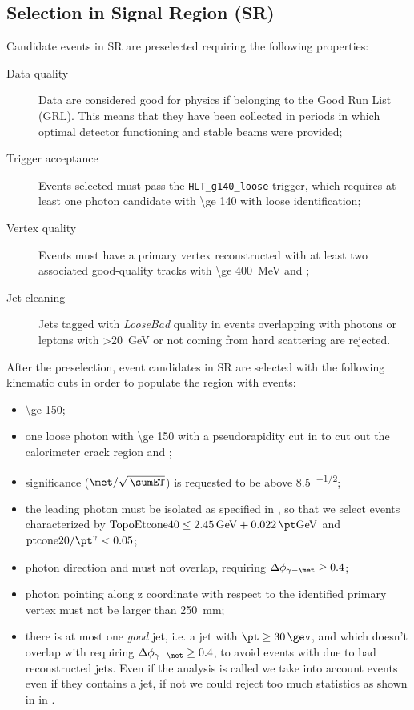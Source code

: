 \subsection{Selection in Signal Region (SR)}
Candidate events in SR are preselected requiring the following properties:
\begin{description}
\item [Data quality] Data are considered good for physics if belonging to the Good Run List (GRL). This means that they have been collected in periods in which optimal detector functioning and stable beams were provided;
\item [Trigger acceptance] Events selected must pass the  \verb!HLT_g140_loose! trigger, which requires at least one photon candidate with \pt \SI{\ge 140}{\gev} with loose identification;
\item [Vertex quality] Events must have a primary vertex reconstructed with at least two associated good-quality tracks with \pt \SI{\ge 400}{\MeV} and ;
\item [Jet cleaning] Jets tagged with {\itshape LooseBad} quality  in events overlapping with photons or leptons with \pt \SI{>20}{\GeV} or not coming from hard scattering are rejected.
\end{description}

After the preselection, event candidates in SR are selected with the following kinematic cuts in order to populate the region with \gmet events:
\begin{itemize}
\item \met \SI{\ge 150}{\gev};
\item one loose photon with \pt \SI{\ge 150}{\gev} with a pseudorapidity cut in  to cut out the calorimeter crack region and ;
\item \met significance ($\met/\sqrt{\,\sumET}$) is requested to be above \SI{8.5}{\gev^{-1/2}};
\item the leading photon must be isolated as specified in \Sect{\ref{sec:phisolation}}, so that we select events characterized by $ \text{TopoEtcone40} \le \SI{2.45}{\GeV} + \SI{0.022}{\pt\GeV}$ and $\text{ptcone20}/\pt^\gamma<0.05$;
\item photon direction and \met must not overlap, requiring $\Delta\phi_{\gamma - \met} \ge 0.4$;
\item photon pointing along z coordinate with respect to the identified primary vertex must not be larger than \SI{250}{\mm};
\item there is at most one {\itshape good} jet, i.e. a jet with $\pt\ge\SI{30}{\gev}$,  and which doesn't overlap with \met requiring $\Delta\phi_{\gamma -\met} \ge 0.4$, to avoid events with \met due to bad reconstructed jets.  Even if the analysis is called \mph we take into account events even if they contains a jet, if not we could reject too much statistics as shown in  \Fig{\ref{fig:validation}} in \Sect{\ref{sec:truth}}.

\end{itemize}

